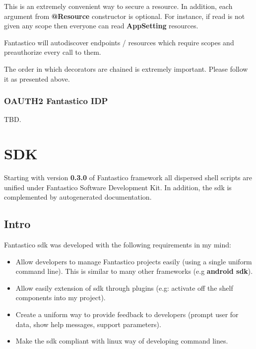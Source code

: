 \documentclass[letterpaper,10pt,english]{sphinxmanual}
\begin{document}
This is an extremely convenient way to secure a resource. In addition, each argument from \textbf{@Resource} constructor is optional.
For instance, if read is not given any scope then everyone can read \textbf{AppSetting} resources.

Fantastico will autodiscover endpoints / resources which require scopes and preauthorize every call to them.

The order in which decorators are chained is extremely important. Please follow it as presented above.


\subsubsection{OAUTH2 Fantastico IDP}
\label{features/oauth2/idp:oauth2-fantastico-idp}\label{features/oauth2/idp::doc}
TBD.


\section{SDK}
\label{features/sdk::doc}\label{features/sdk:sdk}
Starting with version \textbf{0.3.0} of Fantastico framework all dispersed shell scripts are unified under Fantastico Software
Development Kit. In addition, the sdk is complemented by autogenerated documentation.


\subsection{Intro}
\label{features/sdk:intro}
Fantastico sdk was developed with the following requirements in my mind:
\begin{itemize}
\item {} 
Allow developers to manage Fantastico projects easily (using a single uniform command line). This is similar to many other frameworks (e.g \textbf{android sdk}).

\item {} 
Allow easily extension of sdk through plugins (e.g: activate off the shelf components into my project).

\item {} 
Create a uniform way to provide feedback to developers (prompt user for data, show help messages, support parameters).

\item {} 
Make the sdk compliant with linux way of developing command lines.

\end{itemize}
\end{document}
